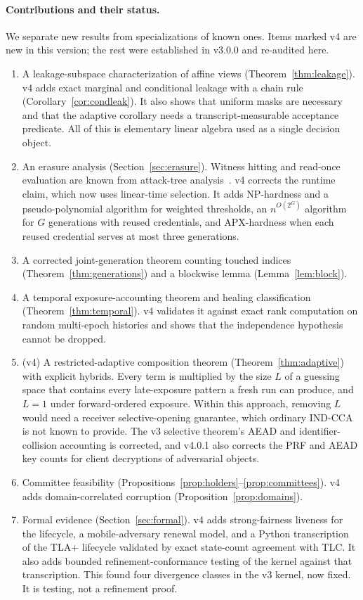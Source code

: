 \documentclass[pdflatex,sn-mathphys-num]{sn-jnl}
\theoremstyle{plain}
\theoremstyle{definition}
\begin{document}
\paragraph{Contributions and their status.}
We separate new results from specializations of known ones. Items marked v4 are new in this version; the rest were established in v3.0.0 and re-audited here.
\begin{enumerate}
\item A leakage-subspace characterization of affine views (Theorem~\ref{thm:leakage}). v4 adds exact marginal and conditional leakage with a chain rule (Corollary~\ref{cor:condleak}). It also shows that uniform masks are necessary and that the adaptive corollary needs a transcript-measurable acceptance predicate. All of this is elementary linear algebra used as a single decision object.
\item An erasure analysis (Section~\ref{sec:erasure}). Witness hitting and read-once evaluation are known from attack-tree analysis~\cite{mauw2005,lopuhaa2022}. v4 corrects the runtime claim, which now uses linear-time selection. It adds NP-hardness and a pseudo-polynomial algorithm for weighted thresholds, an $n^{O(2^G)}$ algorithm for $G$ generations with reused credentials, and APX-hardness when each reused credential serves at most three generations.
\item A corrected joint-generation theorem counting touched indices (Theorem~\ref{thm:generations}) and a blockwise lemma (Lemma~\ref{lem:block}).
\item A temporal exposure-accounting theorem and healing classification (Theorem~\ref{thm:temporal}). v4 validates it against exact rank computation on random multi-epoch histories and shows that the independence hypothesis cannot be dropped.
\item (v4) A restricted-adaptive composition theorem (Theorem~\ref{thm:adaptive}) with explicit hybrids. Every term is multiplied by the size $L$ of a guessing space that contains every late-exposure pattern a fresh run can produce, and $L=1$ under forward-ordered exposure. Within this approach, removing $L$ would need a receiver selective-opening guarantee, which ordinary IND-CCA is not known to provide. The v3 selective theorem's AEAD and identifier-collision accounting is corrected, and v4.0.1 also corrects the PRF and AEAD key counts for client decryptions of adversarial objects.
\item Committee feasibility (Propositions~\ref{prop:holders}--\ref{prop:committees}). v4 adds domain-correlated corruption (Proposition~\ref{prop:domains}).
\item Formal evidence (Section~\ref{sec:formal}). v4 adds strong-fairness liveness for the lifecycle, a mobile-adversary renewal model, and a Python transcription of the TLA+ lifecycle validated by exact state-count agreement with TLC. It also adds bounded refinement-conformance testing of the kernel against that transcription. This found four divergence classes in the v3 kernel, now fixed. It is testing, not a refinement proof.
\end{enumerate}
\end{document}
